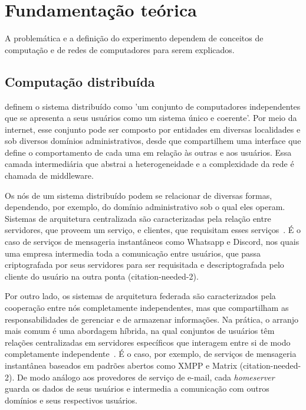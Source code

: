 \section{Fundamentação teórica}\label{sec:background}

A problemática e a definição do experimento dependem de conceitos de computação e de redes de computadores para serem explicados.

\subsection{Computação distribuída}

	\textcite{tanenbaum-distribuidos-livro} definem o sistema distribuído como 'um conjunto de computadores independentes que se apresenta a seus usuários como um sistema único e coerente'. Por meio da internet, esse conjunto pode ser composto por entidades em diversas localidades e sob diversos domínios administrativos, desde que compartilhem uma interface que define o comportamento de cada uma em relação às outras e aos usuários. Essa camada intermediária que abstrai a heterogeneidade e a complexidade da rede é chamada de middleware.

	Os nós de um sistema distribuído podem se relacionar de diversas formas, dependendo, por exemplo, do domínio administrativo sob o qual eles operam. Sistemas de arquitetura centralizada são caracterizadas pela relação entre servidores, que proveem um serviço, e clientes, que requisitam esses serviços~\parencite{tanenbaum-distribuidos-centralizada}. É o caso de serviços de mensageria instantâneos como Whatsapp e Discord, nos quais uma empresa intermedia toda a comunicação entre usuários, que passa criptografada por seus servidores para ser requisitada e descriptografada pelo cliente do usuário na outra ponta (citation-needed-2).

	Por outro lado, os sistemas de arquitetura federada são caracterizados pela cooperação entre nós completamente independentes, mas que compartilham as responsabilidades de gerenciar e de armazenar informações. Na prática, o arranjo mais comum é uma abordagem híbrida, na qual conjuntos de usuários têm relações centralizadas em servidores específicos que interagem entre si de modo completamente independente~\parencite{tanenbaum-distribuidos-federada}. É o caso, por exemplo, de serviços de mensageria instantânea baseados em padrões abertos como XMPP e Matrix (citation-needed-2). De modo análogo aos provedores de serviço de e-mail, cada \textit{homeserver} guarda os dados de seus usuários e intermedia a comunicação com outros domínios e seus respectivos usuários.
	
